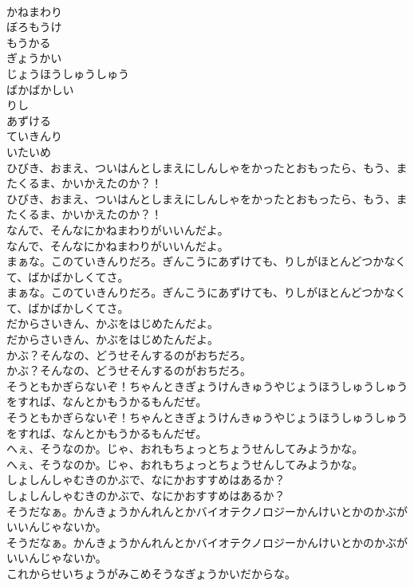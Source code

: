 \documentclass[8pt]{extreport}
\begin{document}
\begin{CJK}{UTF8}{min}
\\	かねまわり
\\	ぼろもうけ
\\	もうかる
\\	ぎょうかい
\\	じょうほうしゅうしゅう
\\	ばかばかしい
\\	りし
\\	あずける
\\	ていきんり
\\	いたいめ
\\	ひびき、おまえ、ついはんとしまえにしんしゃをかったとおもったら、もう、またくるま、かいかえたのか？！
\\	ひびき、おまえ、ついはんとしまえにしんしゃをかったとおもったら、もう、またくるま、かいかえたのか？！
\\	なんで、そんなにかねまわりがいいんだよ。
\\	なんで、そんなにかねまわりがいいんだよ。
\\	まぁな。このていきんりだろ。ぎんこうにあずけても、りしがほとんどつかなくて、ばかばかしくてさ。
\\	まぁな。このていきんりだろ。ぎんこうにあずけても、りしがほとんどつかなくて、ばかばかしくてさ。
\\	だからさいきん、かぶをはじめたんだよ。
\\	だからさいきん、かぶをはじめたんだよ。
\\	かぶ？そんなの、どうせそんするのがおちだろ。
\\	かぶ？そんなの、どうせそんするのがおちだろ。
\\	そうともかぎらないぞ！ちゃんときぎょうけんきゅうやじょうほうしゅうしゅうをすれば、なんとかもうかるもんだぜ。
\\	そうともかぎらないぞ！ちゃんときぎょうけんきゅうやじょうほうしゅうしゅうをすれば、なんとかもうかるもんだぜ。
\\	へぇ、そうなのか。じゃ、おれもちょっとちょうせんしてみようかな。
\\	へぇ、そうなのか。じゃ、おれもちょっとちょうせんしてみようかな。
\\	しょしんしゃむきのかぶで、なにかおすすめはあるか？
\\	しょしんしゃむきのかぶで、なにかおすすめはあるか？
\\	そうだなぁ。かんきょうかんれんとかバイオテクノロジーかんけいとかのかぶがいいんじゃないか。
\\	そうだなぁ。かんきょうかんれんとかバイオテクノロジーかんけいとかのかぶがいいんじゃないか。
\\	これからせいちょうがみこめそうなぎょうかいだからな。

\end{CJK}
\end{document}
